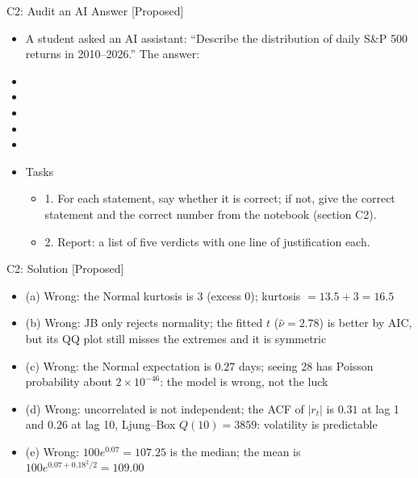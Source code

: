 \begin{frame}{C2: Audit an AI Answer [Proposed]}
\itemsize{\scriptsize}
\begin{itemize}
    \item A student asked an AI assistant: ``Describe the distribution of daily S\&P 500 returns in 2010--2026.'' The answer:
    \item {}
    \item {}
    \item {}
    \item {}
    \item {}
    \item Tasks
    \begin{itemize}
        \item 1. For each statement, say whether it is correct; if not, give the correct statement and the correct number from the notebook (section C2).
        \item 2. Report: a list of five verdicts with one line of justification each.
    \end{itemize}
\end{itemize}
\end{frame}

\ifsolutions
\begin{frame}{C2: Solution [Proposed]}
\itemsize{\footnotesize}
\begin{itemize}
    \item (a) Wrong: the Normal kurtosis is 3 (excess 0); kurtosis $= 13.5 + 3 = 16.5$
    \item (b) Wrong: JB only rejects normality; the fitted $t$ ($\hat\nu = 2.78$) is better by AIC, but its QQ plot still misses the extremes and it is symmetric
    \item (c) Wrong: the Normal expectation is $0.27$ days; seeing 28 has Poisson probability about $2 \times 10^{-46}$: the model is wrong, not the luck
    \item (d) Wrong: uncorrelated is not independent; the ACF of $|r_t|$ is $0.31$ at lag 1 and $0.26$ at lag 10, Ljung--Box $Q(10) = 3859$: volatility is predictable
    \item (e) Wrong: $100e^{0.07} = 107.25$ is the median; the mean is $100e^{0.07 + 0.18^2/2} = 109.00$
\end{itemize}
\end{frame}
\fi


